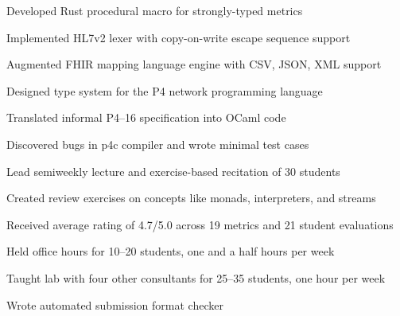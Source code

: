 \documentclass{resume}
\begin{document}
\begin{experience}
	\begin{description}
		\item Developed Rust procedural macro for strongly-typed metrics
		\item Implemented HL7v2 lexer with copy-on-write escape sequence support
		\item Augmented FHIR mapping language engine with CSV, JSON, XML support
	\end{description}

	\begin{description}
		\item Designed type system for the P4 network programming language
		\item Translated informal P4--16 specification into OCaml code
		\item Discovered bugs in p4c compiler and wrote minimal test cases
	\end{description}

	\begin{description}
		\item Lead semiweekly lecture and exercise-based recitation of 30 students
		\item Created review exercises on concepts like monads, interpreters, and streams
		\item Received average rating of 4.7/5.0 across 19 metrics and 21 student evaluations
	\end{description}

	\begin{description}
		\item Held office hours for 10--20 students, one and a half hours per week
		\item Taught lab with four other consultants for 25--35 students, one hour per week
		\item Wrote automated submission format checker
	\end{description}
\end{experience}
\end{document}
